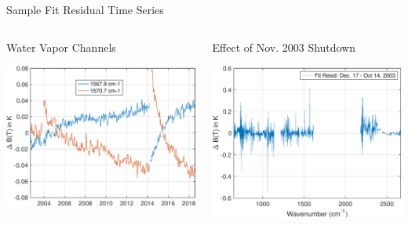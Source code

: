 \documentclass[10pt,t]{beamer}
\begin{document}
\begin{frame}[label={sec:org71c5196}]{Sample Fit Residual Time Series}
\vspace{-0.35in}
\begin{columns}
\begin{column}{0.5\columnwidth}
\begin{block}{\footnotesize Water Vapor Channels}
\vspace{-0.1in}
\begin{center}
\includegraphics[width=0.85\linewidth]{./Figs/Pdf/resid_1567_and_1570_cm01_dnu.pdf}
\end{center}
\end{block}
\end{column}

\begin{column}{0.5\columnwidth}
\begin{block}{\footnotesize Effect of Nov. 2003 Shutdown}
\vspace{-0.1in}
\begin{center}
\includegraphics[width=0.85\linewidth]{./Figs/Pdf/resid_spectrum_dec17_minus_oct14_2003.pdf}
\end{center}
\end{block}
\end{column}
\end{columns}


\end{frame}
\end{document}
